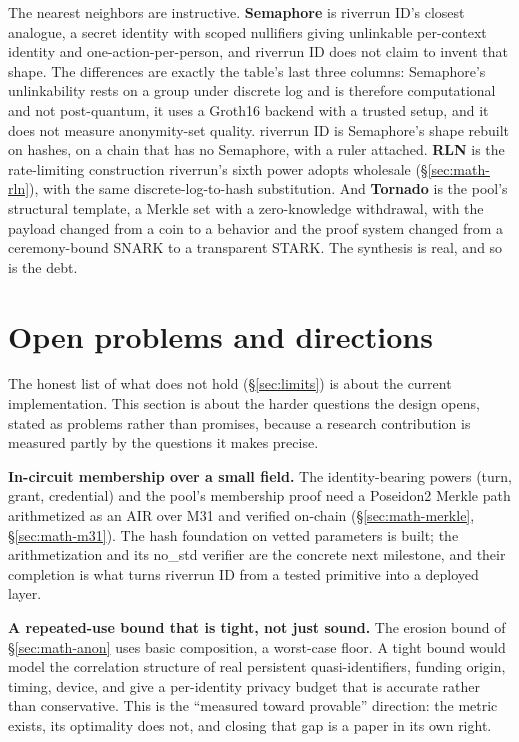 \documentclass[11pt]{article}
\begin{document}
The nearest neighbors are instructive. \textbf{Semaphore} is riverrun ID's closest analogue,
a secret identity with scoped nullifiers giving unlinkable per-context identity and
one-action-per-person, and riverrun ID does not claim to invent that shape. The differences
are exactly the table's last three columns: Semaphore's unlinkability rests on a group under
discrete log and is therefore computational and not post-quantum, it uses a Groth16 backend
with a trusted setup, and it does not measure anonymity-set quality. riverrun ID is
Semaphore's shape rebuilt on hashes, on a chain that has no Semaphore, with a ruler attached.
\textbf{RLN} is the rate-limiting construction riverrun's sixth power adopts wholesale
(\S\ref{sec:math-rln}), with the same discrete-log-to-hash substitution. And \textbf{Tornado}
is the pool's structural template, a Merkle set with a zero-knowledge withdrawal, with the
payload changed from a coin to a behavior and the proof system changed from a ceremony-bound
SNARK to a transparent STARK. The synthesis is real, and so is the debt.

\section{Open problems and directions}
\label{sec:open}

The honest list of what does not hold (\S\ref{sec:limits}) is about the current
implementation. This section is about the harder questions the design opens, stated as
problems rather than promises, because a research contribution is measured partly by the
questions it makes precise.

\textbf{In-circuit membership over a small field.} The identity-bearing powers (turn, grant,
credential) and the pool's membership proof need a Poseidon2 Merkle path arithmetized as an
AIR over M31 and verified on-chain (\S\ref{sec:math-merkle}, \S\ref{sec:math-m31}). The hash
foundation on vetted parameters is built; the arithmetization and its no\_std verifier are the
concrete next milestone, and their completion is what turns riverrun ID from a tested
primitive into a deployed layer.

\textbf{A repeated-use bound that is tight, not just sound.} The erosion bound of
\S\ref{sec:math-anon} uses basic composition, a worst-case floor. A tight bound would model
the correlation structure of real persistent quasi-identifiers, funding origin, timing,
device, and give a per-identity privacy budget that is accurate rather than conservative.
This is the ``measured toward provable'' direction: the metric exists, its optimality does
not, and closing that gap is a paper in its own right.
\end{document}
